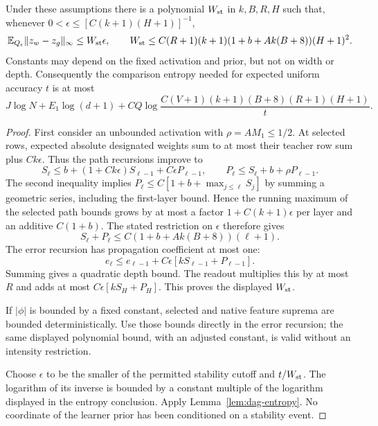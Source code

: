 \begin{lemma}
\label{lem:stable-dag-error}
Under these assumptions there is a polynomial $W_{\rm st}$ in $k,B,R,H$ such that, whenever
$0<\epsilon\le[C(k+1)(H+1)]^{-1}$,
\[
 \mathbb E_{Q_\epsilon}\|z_w-z_g\|_\infty\le W_{\rm st}\epsilon,
 \qquad
 W_{\rm st}\le C(R+1)(k+1)(1+b+Ak(B+8))(H+1)^2.
\]
Constants may depend on the fixed activation and prior, but not on width or depth. Consequently the comparison entropy needed for expected uniform accuracy $t$ is at most
\[
 J\log N+E_1\log(d+1)
   +C Q\log\frac{C(V+1)(k+1)(B+8)(R+1)(H+1)}t.
\]
\end{lemma}
\begin{proof}
First consider an unbounded activation with $\rho=AM_1\le1/2$. At selected rows, expected absolute designated weights sum to at most their teacher row sum plus $Ck\epsilon$. Thus the path recursions improve to
\[
 S_\ell\le b+(1+Ck\epsilon)S_{\ell-1}+C\epsilon P_{\ell-1},
 \qquad P_\ell\le S_\ell+b+\rho P_{\ell-1}.
\]
The second inequality implies
$P_\ell\le C[1+b+\max_{j\le\ell}S_j]$ by summing a geometric series, including the first-layer bound. Hence the running maximum of the selected path bounds grows by at most a factor $1+C(k+1)\epsilon$ per layer and an additive $C(1+b)$. The stated restriction on $\epsilon$ therefore gives
\[
 S_\ell+P_\ell
 \le C(1+b+Ak(B+8))(\ell+1).
\]
The error recursion has propagation coefficient at most one:
\[
 e_\ell\le e_{\ell-1}
             +C\epsilon[kS_{\ell-1}+P_{\ell-1}].
\]
Summing gives a quadratic depth bound. The readout multiplies this by at most $R$ and adds at most $C\epsilon[kS_H+P_H]$. This proves the displayed $W_{\rm st}$.

If $|\phi|$ is bounded by a fixed constant, selected and native feature suprema are bounded deterministically. Use those bounds directly in the error recursion; the same displayed polynomial bound, with an adjusted constant, is valid without an intensity restriction.

Choose $\epsilon$ to be the smaller of the permitted stability cutoff and $t/W_{\rm st}$. The logarithm of its inverse is bounded by a constant multiple of the logarithm displayed in the entropy conclusion. Apply Lemma~\ref{lem:dag-entropy}. No coordinate of the learner prior has been conditioned on a stability event.
\end{proof}
